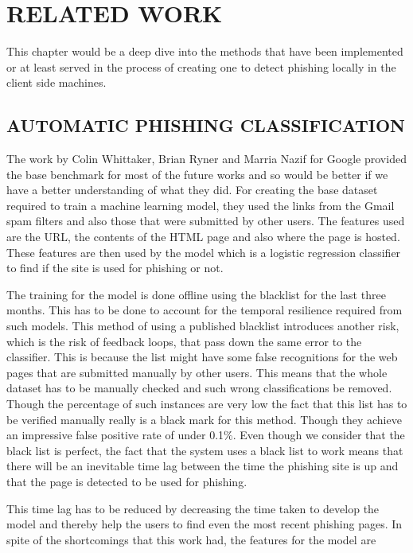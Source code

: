 \chapter{RELATED WORK} %
This chapter would be a deep dive into the methods that have been implemented or at least served in the process of creating one to detect phishing locally in the client side machines.

\section{AUTOMATIC PHISHING CLASSIFICATION}
The work \cite{whittaker} by Colin Whittaker, Brian Ryner and Marria Nazif for Google provided the base benchmark for most of the future works and so would be better if we have a better understanding of what they did. For creating the base dataset required to train a machine learning model, they used the links from the Gmail spam filters \cite{google} and also those that were submitted by other users. The features used are the URL, the contents of the HTML page and also where the page is hosted. These features are then used by the model which is a logistic regression classifier to find if the site is used for phishing or not.

The training for the model is done offline using the blacklist for the last three months. This has to be done to account for the temporal resilience required from such models. This method of using a published blacklist introduces another risk, which is the risk of feedback loops, that pass down the same error to the classifier. This is because the list might have some false recognitions for the web pages that are submitted manually by other users. This means that the whole dataset has to be manually checked and such wrong classifications be removed. Though the percentage of such instances are very low the fact that this list has to be verified manually really is a black mark for this method. Though they achieve an impressive false positive rate of under 0.1\%. Even though we consider that the black list is perfect, the fact that the system uses a black list to work means that there will be an inevitable time lag between the time the phishing site is up and that the page is detected to be used for phishing.

This time lag has to be reduced by decreasing the time taken to develop the model and thereby help the users to find even the most recent phishing pages. In spite of the shortcomings that this work had, the features for the model are

